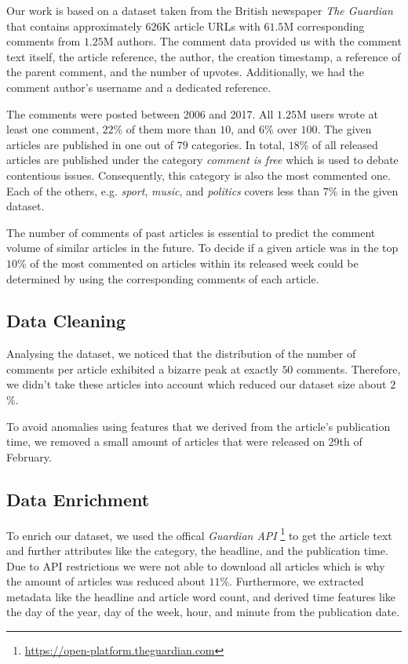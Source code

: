Our work is based on a dataset taken from the British newspaper \textit{The Guardian} that contains approximately $626$K article URLs with $61.5$M corresponding comments from $1.25$M authors.
The comment data provided us with the comment text itself, the article reference, the author, the creation timestamp, a reference of the parent comment, and the number of upvotes. Additionally, we had the comment author's username and a dedicated reference.

The comments were posted between 2006 and 2017. All $1.25$M users wrote at least one comment, $22$\% of them more than $10$, and $6$\% over $100$.
The given articles are published in one out of $79$ categories. In total, $18$\% of all released articles are published under the category \textit{comment is free} which is used to debate contentious issues. Consequently, this category is also the most commented one. 
Each of the others, e.g. \textit{sport}, \textit{music}, and \textit{politics} covers less than $7$\% in the given dataset.

The number of comments of past articles is essential to predict the comment volume of similar articles in the future. 
To decide if a given article was in the top $10$\% of the most commented on articles within its released week could be determined by using the corresponding comments of each article.

\subsection{Data Cleaning}
Analysing the dataset, we noticed that the distribution of the number of comments per article exhibited a bizarre peak at exactly $50$ comments. Therefore, we didn't take these articles into account which reduced our dataset size about $2$\%.

To avoid anomalies using features that we derived from the article's publication time, we removed a small amount of articles that were released on 29th of February.

\subsection{Data Enrichment}
To enrich our dataset, we used the offical \textit{Guardian API} \footnote{\url{https://open-platform.theguardian.com}} to get the article text and further attributes like the category, the headline, and the publication time.
Due to API restrictions we were not able to download all articles which is why the amount of articles was reduced about $11$\%.
Furthermore, we extracted metadata like the headline and article word count, and derived time features like the day of the year, day of the week, hour, and minute from the publication date.

